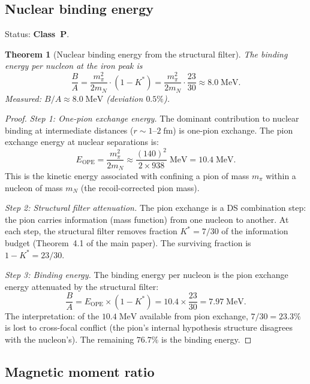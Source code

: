 \documentclass[11pt,a4paper]{article}
\newtheorem{theorem}{Theorem}[section]
\theoremstyle{definition}
\theoremstyle{remark}
\begin{document}
\subsection{Nuclear binding energy}\label{sec:binding}

Status: \textbf{Class~P}.

\begin{theorem}[Nuclear binding energy from the structural filter]\label{thm:binding}
The binding energy per nucleon at the iron peak is
\begin{equation}
\frac{B}{A} = \frac{m_\pi^2}{2 m_N} \cdot (1 - K^*) = \frac{m_\pi^2}{2 m_N} \cdot \frac{23}{30} \approx 8.0\;\mathrm{MeV}.
\end{equation}
Measured: $B/A \approx 8.0\;\mathrm{MeV}$ (deviation $0.5\%$).
\end{theorem}

\begin{proof}
\emph{Step 1: One-pion exchange energy.}
The dominant contribution to nuclear binding at intermediate distances ($r \sim 1$--$2\;\mathrm{fm}$) is one-pion exchange. The pion exchange energy at nuclear separations is:
\[
E_{\mathrm{OPE}} = \frac{m_\pi^2}{2 m_N} \approx \frac{(140)^2}{2 \times 938}\;\mathrm{MeV} = 10.4\;\mathrm{MeV}.
\]
This is the kinetic energy associated with confining a pion of mass $m_\pi$ within a nucleon of mass $m_N$ (the recoil-corrected pion mass).

\emph{Step 2: Structural filter attenuation.}
The pion exchange is a DS combination step: the pion carries information (mass function) from one nucleon to another. At each step, the structural filter removes fraction $K^* = 7/30$ of the information budget (Theorem~4.1 of the main paper). The surviving fraction is $1 - K^* = 23/30$.

\emph{Step 3: Binding energy.}
The binding energy per nucleon is the pion exchange energy attenuated by the structural filter:
\[
\frac{B}{A} = E_{\mathrm{OPE}} \times (1 - K^*) = 10.4 \times \frac{23}{30} = 7.97\;\mathrm{MeV}.
\]
The interpretation: of the $10.4\;\mathrm{MeV}$ available from pion exchange, $7/30 = 23.3\%$ is lost to cross-focal conflict (the pion's internal hypothesis structure disagrees with the nucleon's). The remaining $76.7\%$ is the binding energy.
\end{proof}


\subsection{Magnetic moment ratio}\label{sec:mag_moment}
\end{document}

